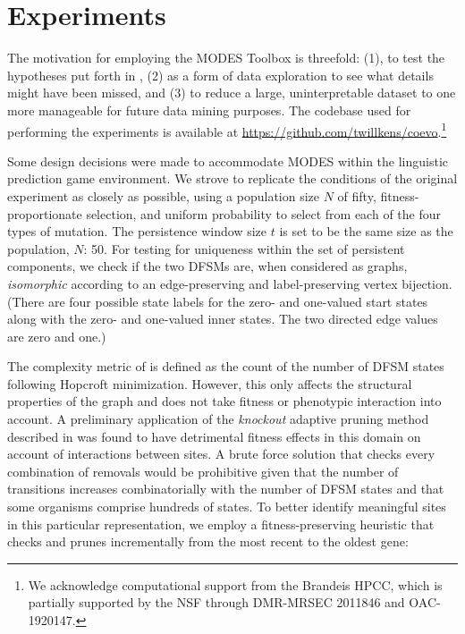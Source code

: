 \documentclass[letterpaper]{article}
\begin{document}
\section{Experiments}
The motivation for employing the MODES Toolbox is threefold: (1), to test the hypotheses put forth in \cite{moran2019}, (2) as a form of data exploration to see what details might have been missed, and (3) to reduce a large, uninterpretable dataset to one more manageable for future data mining purposes. The codebase used for performing the experiments is available at \url{https://github.com/twillkens/coevo}.\footnote{We acknowledge computational support from the Brandeis HPCC, which is partially supported by the NSF through DMR-MRSEC 2011846 and OAC-1920147.}

Some design decisions were made to accommodate MODES within the linguistic prediction game environment. We strove to replicate the conditions of the original experiment as closely as possible, using a population size $N$ of fifty, fitness-proportionate selection, and uniform probability to select from each of the four types of mutation. The persistence window size $t$ is set to be the same size as the population, $N$: 50. For testing for uniqueness within the set of persistent components, we check if the two DFSMs are, when considered as graphs, \textit{isomorphic} according to an edge-preserving and label-preserving vertex bijection. (There are four possible state labels for the zero- and one-valued start states along with the zero- and one-valued inner states. The two directed edge values are zero and one.)

The complexity metric of \cite{moran2019} is defined as the count of the number of DFSM states following Hopcroft minimization. However, this only affects the structural properties of the graph and does not take fitness or phenotypic interaction into account. A preliminary application of the \textit{knockout} adaptive pruning method described in \cite{dolson2019} was found to have detrimental fitness effects in this domain on account of interactions between sites. A brute force solution that checks every combination of removals would be prohibitive given that the number of transitions increases combinatorially with the number of DFSM states and that some organisms comprise hundreds of states. To better identify meaningful sites in this particular representation, we employ a fitness-preserving heuristic that checks and prunes incrementally from the most recent to the oldest gene:
\end{document}
